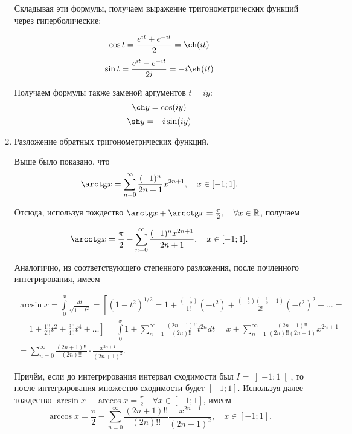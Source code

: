 \documentclass[../../main.tex]{subfiles}
\begin{document}
\begin{enumerate}
        Складывая эти формулы, получаем выражение тригонометрических функций 
        через гиперболические:
        
        \[ \cos t = \frac{e^{it} + e^{-it}}{2} = \ch (it) \]
        \[ \sin t = \frac{e^{it} - e^{-it}}{2i} = -i\sh (it) \]
        
        Получаем формулы также заменой аргументов $t = iy$:
        \[ \ch y = \cos(iy)\]
        \[\sh y = -i \sin (iy)\]
        
        \item Разложение обратных тригонометрических функций.
        
        Выше было показано, что 
        \[ \arctg x = \sum\limits_{n = 0}^{\infty} \frac{(-1)^n}{2n + 1}
        x^{2n+1}, \quad x \in [-1;1]. \]
        
        Отсюда, используя тождество $\arctg x + \arcctg x = \frac{\pi}{2}, 
        \quad \forall x \in \R$, получаем 
        
        \[ \arcctg x = \frac{\pi}{2} - \sum\limits_{n = 0}^{\infty} 
        \frac{(-1)^nx^{2n+1}}{2n + 1}, \quad x \in [-1; 1]. \]
        
        Аналогично, из соответствующего степенного разложения, после 
        почленного интегрирования, имеем
    
        \begin{multline*}
            \arcsin x = \int\limits_{0}^{x} \frac{dt}{\sqrt{1 - t^2}} =
            \left[(1 - t^2)^{1/2} = 1 + \frac{(-\frac12)}{1!}(-t^2) + 
            \frac{(-\frac12)(-\frac12 - 1)}{2!}(-t^2)^2 + \ldots = 
            \right.\\\left. =
            1 + \frac{1!!}{2!!}t^2 + \frac{3!!}{4!!}t^4 + \ldots \right] = 
            \int\limits_{0}^{x} 1 + \sum\limits_{n = 1}^{\infty} 
            \frac{(2n-1)!!}{(2n)!!} t^{2n}dt = x + \sum\limits_{n = 
            1}^{\infty} 
            \frac{(2n-1)!!}{(2n)!!(2n+1)}x^{2n+1} = \\ = 
            \sum\limits_{n = 0}^{\infty} \frac{(2n + 1)!!}{(2n)!!} 
            \cdot \frac{x^{2n+1}}{(2n+1)^2}.
        \end{multline*}
        
        Причём, если до интегрирования интервал сходимости был $I = 
        \left]-1;1\right[$, 
        то после интегрирования множество сходимости будет $[-1;1]$.
        Используя далее тождество $\arcsin x + \arccos x = \frac{\pi}{2} \quad 
        \forall x \in [-1; 1]$, имеем \[ \arccos x = \frac{\pi}{2} - 
        \sum\limits_{n = 0}^{\infty} \frac{(2n + 1)!!}{(2n)!!} 
        \frac{x^{2n + 1}}{(2n + 1)^2}, \quad x \in [-1; 1].\]
        

\end{enumerate}
\end{document}

